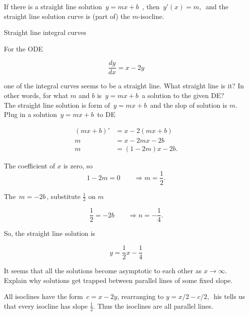 If there is a straight line solution $\, y=mx+b\,$ , then $\, y'(x)=m,\,$
and the straight line solution curve is (part of) the $m$-isocline.

\begin{problem}
  Straight line integral curves
\end{problem}

For the ODE

\begin{equation*}
  \displaystyle \frac{dy}{dx} = x-2y
\end{equation*}

one of the integral curves seems to be a straight line.
What straight line is it? In other words, for what $m$ and $b$ is $\, y = mx + b\,$
a solution to the given DE?\\

The straight line solution is form of $\, y=mx+b\,$ and the slop of solution is $m$.
Plug in a solution $\, y=mx+b\,$ to DE

\begin{align*}
  (mx + b)' &= x -2(mx + b) \\
  m &= x - 2mx - 2b \\
  m &= (1- 2m)x - 2b. 
\end{align*}

The coefficient of $x$ is zero, so
\begin{equation*}
  1 - 2m = 0 \qquad \Longrightarrow m = \frac{1}{2}. 
\end{equation*}

The $\, m = -2b \,$, substitute $\frac{1}{2}$ on $m$

\begin{equation*}
  \frac{1}{2} = -2b \qquad \Longrightarrow n = - \frac{1}{4}. 
\end{equation*}

So, the straight line solution is

\begin{equation*}
  y = \frac{1}{2} x - \frac{1}{4}
\end{equation*}

\begin{question}
  It seems that all the solutions become asymptotic to each other as $x \rightarrow \infty$.
  Explain why solutions get trapped between parallel lines of some fixed slope.  
\end{question}

All isoclines have the form $\, c= x-2y$, rearranging to $y = x/2 - c/2,\,$
his tells us that every isocline has slope $\frac{1}{2}$.
Thus the isoclines are all parallel lines. \\

